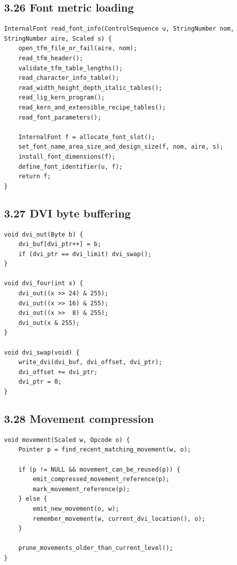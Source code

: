 \documentclass[11pt]{article}
\begin{document}
\subsection{3.26 Font metric loading}\label{font-metric-loading}

\begin{verbatim}
InternalFont read_font_info(ControlSequence u, StringNumber nom, StringNumber aire, Scaled s) {
    open_tfm_file_or_fail(aire, nom);
    read_tfm_header();
    validate_tfm_table_lengths();
    read_character_info_table();
    read_width_height_depth_italic_tables();
    read_lig_kern_program();
    read_kern_and_extensible_recipe_tables();
    read_font_parameters();

    InternalFont f = allocate_font_slot();
    set_font_name_area_size_and_design_size(f, nom, aire, s);
    install_font_dimensions(f);
    define_font_identifier(u, f);
    return f;
}
\end{verbatim}

\subsection{3.27 DVI byte buffering}\label{dvi-byte-buffering}

\begin{verbatim}
void dvi_out(Byte b) {
    dvi_buf[dvi_ptr++] = b;
    if (dvi_ptr == dvi_limit) dvi_swap();
}

void dvi_four(int x) {
    dvi_out((x >> 24) & 255);
    dvi_out((x >> 16) & 255);
    dvi_out((x >>  8) & 255);
    dvi_out(x & 255);
}

void dvi_swap(void) {
    write_dvi(dvi_buf, dvi_offset, dvi_ptr);
    dvi_offset += dvi_ptr;
    dvi_ptr = 0;
}
\end{verbatim}

\subsection{3.28 Movement compression}\label{movement-compression}

\begin{verbatim}
void movement(Scaled w, Opcode o) {
    Pointer p = find_recent_matching_movement(w, o);

    if (p != NULL && movement_can_be_reused(p)) {
        emit_compressed_movement_reference(p);
        mark_movement_reference(p);
    } else {
        emit_new_movement(o, w);
        remember_movement(w, current_dvi_location(), o);
    }

    prune_movements_older_than_current_level();
}
\end{verbatim}
\end{document}

